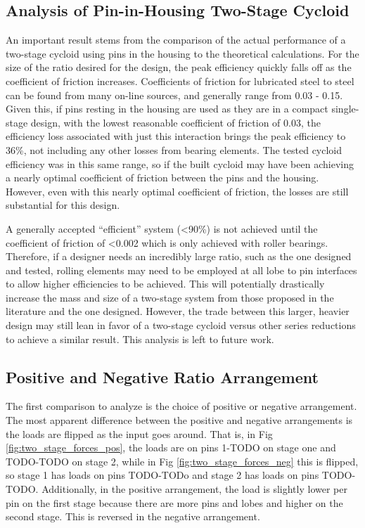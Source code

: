 \subsection{Analysis of Pin-in-Housing Two-Stage Cycloid} \label{ch:dual:discussion:actual}

An important result stems from the comparison of the actual performance of a two-stage cycloid using pins in the housing to the theoretical calculations. For the size of the ratio desired for the design, the peak efficiency quickly falls off as the coefficient of friction increases. Coefficients of friction for lubricated steel to steel can be found from many on-line sources, and generally range from 0.03 - 0.15. Given this, if pins resting in the housing are used as they are in a compact single-stage design, with the lowest reasonable coefficient of friction of 0.03, the efficiency loss associated with just this interaction brings the peak efficiency to 36\%, not including any other losses from bearing elements. The tested cycloid efficiency was in this same range, so if the built cycloid may have been achieving a nearly optimal coefficient of friction between the pins and the housing. However, even with this nearly optimal coefficient of friction, the losses are still substantial for this design. 


A generally accepted ``efficient'' system (\textless90\%) is not achieved until the coefficient of friction of \textless0.002 which is only achieved with roller bearings. Therefore, if a designer needs an incredibly large ratio, such as the one designed and tested, rolling elements may need to be employed at all lobe to pin interfaces to allow higher efficiencies to be achieved. This will potentially drastically increase the mass and size of a two-stage system from those proposed in the literature and the one designed. However, the trade between this larger, heavier design may still lean in favor of a two-stage cycloid versus other series reductions to achieve a similar result. This analysis is left to future work. 

\subsection{Positive and Negative Ratio Arrangement}\label{ch:dual:discussion:pos_neg}

The first comparison to analyze is the choice of positive or negative arrangement. The most apparent difference between the positive and negative arrangements is the loads are flipped as the input goes around. That is, in Fig \ref{fig:two_stage_forces_pos}, the loads are on pins 1-TODO on stage one and TODO-TODO on stage 2, while in Fig \ref{fig:two_stage_forces_neg} this is flipped, so stage 1 has loads on pins TODO-TODo and stage 2 has loads on pins TODO-TODO. Additionally, in the positive arrangement, the load is slightly lower per pin on the first stage because there are more pins and lobes and higher on the second stage. This is reversed in the negative arrangement. 

